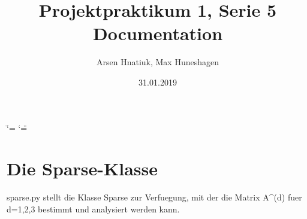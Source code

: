 \documentclass[letterpaper,10pt,ngerman]{sphinxmanual}
\title{Projektpraktikum 1, Serie 5 Documentation}
\date{31.01.2019}
\author{Arsen Hnatiuk, Max Huneshagen}
\begin{document}
\ifdefined\shorthandoff
  \ifnum\catcode`\=\string=\active\shorthandoff{=}\fi
  \ifnum\catcode`\"=\active{}\fi
\fi
\maketitle
\sphinxtableofcontents
{}\label{\detokenize{index::doc}}



\chapter{Die Sparse-Klasse}
\label{\detokenize{index:module-sparse_erw}}\label{\detokenize{index:die-sparse-klasse}}
sparse.py stellt die Klasse Sparse zur Verfuegung, mit der die Matrix A\textasciicircum{}(d) fuer d=1,2,3
bestimmt und analysiert werden kann.
\end{document}
